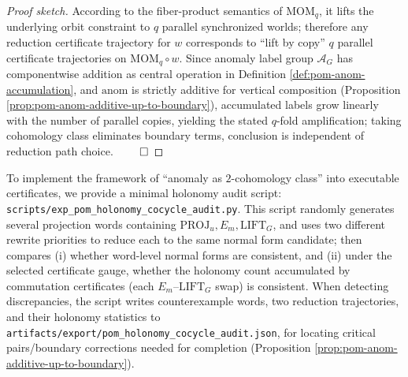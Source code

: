 \begin{proof}[Proof sketch]
According to the fiber-product semantics of \(\mathrm{MOM}_q\), it lifts the underlying orbit constraint to \(q\) parallel synchronized worlds; therefore any reduction certificate trajectory for \(w\) corresponds to ``lift by copy'' \(q\) parallel certificate trajectories on \(\mathrm{MOM}_q\circ w\).
Since anomaly label group \(\mathcal{A}_G\) has componentwise addition as central operation in Definition \ref{def:pom-anom-accumulation}, and \(\mathrm{anom}\) is strictly additive for vertical composition (Proposition \ref{prop:pom-anom-additive-up-to-boundary}), accumulated labels grow linearly with the number of parallel copies, yielding the stated \(q\)-fold amplification; taking cohomology class eliminates boundary terms, conclusion is independent of reduction path choice. $\qed$
\end{proof}

\begin{remark}\label{rem:pom-holonomy-cocycle-audit}
To implement the framework of ``anomaly as \(2\)-cohomology class'' into executable certificates, we provide a minimal holonomy audit script:
\texttt{scripts/exp\_pom\_holonomy\_cocycle\_audit.py}.
This script randomly generates several projection words containing \(\mathrm{PROJ}_u,E_m,\mathrm{LIFT}_G\), and uses two different rewrite priorities to reduce each to the same normal form candidate;
then compares
(i) whether word-level normal forms are consistent,
and
(ii) under the selected certificate gauge, whether the holonomy count accumulated by commutation certificates (each \(E_m\)--\(\mathrm{LIFT}_G\) swap) is consistent.
When detecting discrepancies, the script writes counterexample words, two reduction trajectories, and their holonomy statistics to
\texttt{artifacts/export/pom\_holonomy\_cocycle\_audit.json},
for locating critical pairs/boundary corrections needed for completion (Proposition \ref{prop:pom-anom-additive-up-to-boundary}).
\end{remark}


